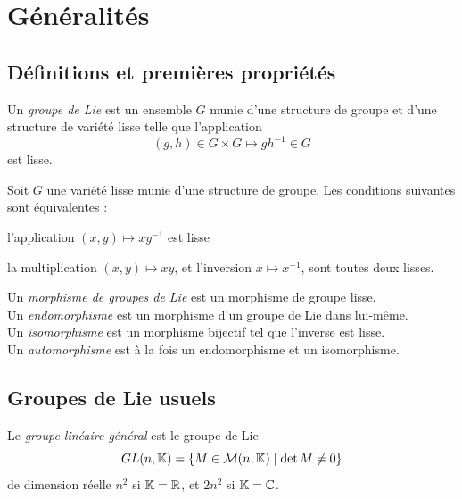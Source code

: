 
\section{Généralités}

\subsection{Définitions et premières propriétés}

\begin{definition}
    Un \emph{groupe de Lie} est un ensemble $G$ munie d'une structure de groupe et d'une structure de variété lisse telle que l'application 
    $$(g, h) \in G\times G \mapsto gh^{-1} \in G$$
    est lisse.
\end{definition}

\begin{proposition}
    Soit $G$ une variété lisse munie d'une structure de groupe. Les conditions suivantes sont équivalentes :
    \begin{ilist}
        \item l'application $(x, y) \mapsto xy^{-1}$ est lisse
        \item la multiplication $(x,y) \mapsto xy$,
          et l'inversion $x \mapsto x^{-1}$, sont
          toutes deux lisses.
    \end{ilist}
\end{proposition}

\omitted

\begin{definition}
    Un \emph{morphisme de groupes de Lie} est un morphisme de groupe lisse. \\
    Un \emph{endomorphisme} est un morphisme d'un groupe de Lie dans lui-même. \\
    Un \emph{isomorphisme} est un morphisme bijectif tel que l'inverse est lisse. \\
    Un \emph{automorphisme} est à la fois un endomorphisme et un isomorphisme.
\end{definition}

\subsection{Groupes de Lie usuels}

\begin{definition}
    Le \emph{groupe linéaire général} est le groupe de Lie
    $$GL(n, \mathbb{K}) = \{ M \in \mathcal{M}(n, \mathbb{K}) \mid \det M \neq 0 \}$$
    de dimension réelle $n^2$ si $\mathbb{K} = \mathbb{R}$, et $2n^2$ si
  $\mathbb{K} = \mathbb{C}$.
\end{definition}

